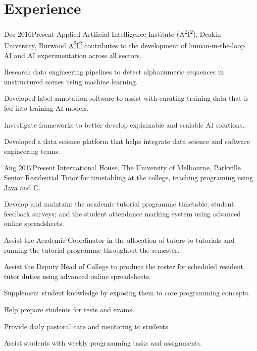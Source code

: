 \section{Experience}

\def \asis{A\textsuperscript{2}I\textsuperscript{2}}

{Dec 2016}{Present}
{Applied Artificial Intelligence Institute (\asis), Deakin University, Burwood}
{\href{http://a2i2.ai}{\asis} contributes to the development of human-in-the-loop AI and AI experimentation across all sectors.}
{
  \item Research data engineering pipelines to detect alphanumeric sequences in unstructured scenes using machine learning.
  \item Developed label annotation software to assist with curating training data that is fed into training AI models.
  \item Investigate frameworks to better develop explainable and scalable AI solutions.
  \item Developed a data science platform that helps integrate data science and software engineering teams.
}

{Aug 2017}{Present}
{International House, The University of Melbourne, Parkville}
{Senior Residential Tutor for timetabling at the college, teaching programing using \href{https://handbook.unimelb.edu.au/2017/subjects/swen20003}{Java} and \href{https://handbook.unimelb.edu.au/2018/subjects/comp20005}{C}.}
{
  \item Develop and maintain: the academic tutorial programme timetable; student feedback surveys; and the student attendance marking system using advanced online spreadsheets.
  \item Assist the Academic Coordinator in the allocation of tutors to tutorials and running the tutorial programme throughout the semester.
  \item Assist the Deputy Head of College to produce the roster for scheduled resident tutor duties using advanced online spreadsheets.
  \item Supplement student knowledge by exposing them to core programming concepts.
  \item Help prepare students for tests and exams.
  \item Provide daily pastoral care and mentoring to students.
  \item Assist students with weekly programming tasks and assignments.
}


